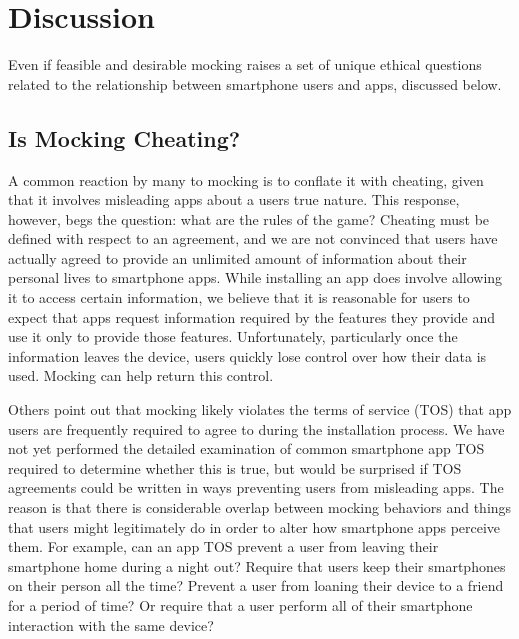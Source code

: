 \section{Discussion}
\label{sec-discussion}

Even if feasible and desirable mocking raises a set of unique ethical
questions related to the relationship between smartphone users and apps,
discussed below.

\subsection{Is Mocking Cheating?}

A common reaction by many to mocking is to conflate it with cheating, given
that it involves misleading apps about a users true nature. This response,
however, begs the question: what are the rules of the game? Cheating must be
defined with respect to an agreement, and we are not convinced that users
have actually agreed to provide an unlimited amount of information about
their personal lives to smartphone apps. While installing an app does involve
allowing it to access certain information, we believe that it is reasonable
for users to expect that apps request information required by the features
they provide and use it only to provide those features. Unfortunately,
particularly once the information leaves the device, users quickly lose
control over how their data is used. Mocking can help return this control.

Others point out that mocking likely violates the terms of service (TOS) that
app users are frequently required to agree to during the installation
process. We have not yet performed the detailed examination of common
smartphone app TOS required to determine whether this is true, but would be
surprised if TOS agreements could be written in ways preventing users from
misleading apps. The reason is that there is considerable overlap between
mocking behaviors and things that users might legitimately do in order to
alter how smartphone apps perceive them. For example, can an app TOS prevent
a user from leaving their smartphone home during a night out? Require that
users keep their smartphones on their person all the time? Prevent a user
from loaning their device to a friend for a period of time? Or require that a
user perform all of their smartphone interaction with the same device?

